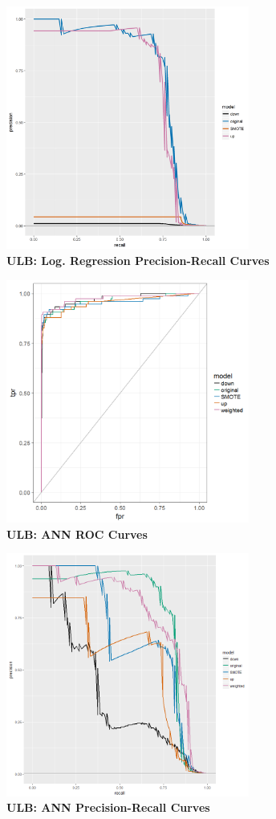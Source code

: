 \documentclass[12pt,]{article}
\begin{document}
\includegraphics[width=0.6\textwidth,height=\textheight]{figures/credit/cr_card_glm_PR.png}\\
\textbf{ULB: Log. Regression Precision-Recall Curves}

\includegraphics[width=0.6\textwidth,height=\textheight]{figures/credit/cr_card_nnet_rocs.png}\\
\textbf{ULB: ANN ROC Curves}

\includegraphics[width=0.6\textwidth,height=\textheight]{figures/credit/cr_card_nnet_PR.png}\\
\textbf{ULB: ANN Precision-Recall Curves}
\end{document}
